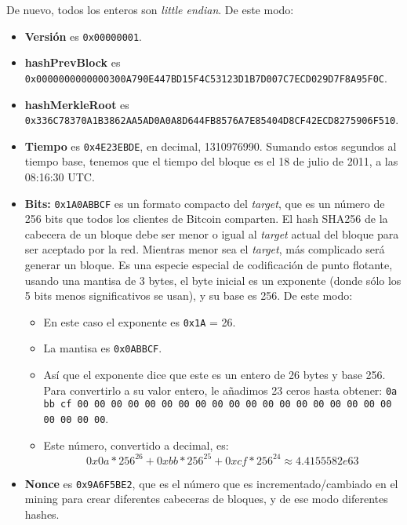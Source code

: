 \documentclass[10pt, a4paper]{article}
\theoremstyle{theorem-style}
\theoremstyle{theorem-style}
\theoremstyle{definition-style}
\theoremstyle{remark-style}
\theoremstyle{example-style}
\theoremstyle{definition-style}
\theoremstyle{remark-style}
\begin{document}
De nuevo, todos los enteros son \emph{little endian}. De este modo:

\begin{itemize}
\def\labelenumi{\arabic{enumi}.}
\itemsep1pt\parskip0pt
\item
  \textbf{Versión} es \texttt{0x00000001}.
\item
  \textbf{hashPrevBlock} es\\\texttt{0x0000000000000300A790E447BD15F4C53123D1B7D007C7ECD029D7F8A95F0C}.
\item
	\textbf{hashMerkleRoot} es\\\texttt{0x336C78370A1B3862AA5AD0A0A8D644FB8576A7E85404D8CF42ECD8275906F510}.
\item
	\textbf{Tiempo} es \texttt{0x4E23EBDE}, en decimal, 1310976990. Sumando estos segundos al tiempo base, tenemos que el tiempo del bloque es el 18 de julio de 2011, a las 08:16:30 UTC.
\item
	\textbf{Bits:} \texttt{0x1A0ABBCF} es un formato compacto del \emph{target}, que es un número de 256 bits que todos los clientes de Bitcoin comparten. El hash SHA256 de la cabecera de un bloque debe ser menor o igual al \emph{target} actual del bloque para ser aceptado por la red. Mientras menor sea el \emph{target}, más complicado será generar un bloque. Es una especie especial de codificación de punto flotante, usando una mantisa de 3 bytes, el byte inicial es un exponente (donde sólo los 5 bits menos significativos se usan), y su base es 256. De este modo:
	\begin{itemize}
	\def\labelenumi{\arabic{enumi}.}
	\itemsep1pt\parskip0pt
	\item
		En este caso el exponente es \texttt{0x1A} = 26.
	\item
		La mantisa es \texttt{0x0ABBCF}.
	\item
		Así que el exponente dice que este es un entero de 26 bytes y base 256. Para convertirlo a su valor entero, le añadimos 23 ceros hasta obtener: \texttt{0a bb cf 00 00   00 00 00 00 00    00 00 00 00 00    00 00 00 00 00    00 00 00 00    00 00}.
	\item
		Este número, convertido a decimal, es:$$0x0a * 256^{26} + 0xbb * 256^{25} + 0xcf*256^{24} \approx  4.4155582e63$$
	\end{itemize}
\item
	\textbf{Nonce} es \texttt{0x9A6F5BE2}, que es el número que es incrementado/cambiado en el mining para crear diferentes cabeceras de bloques, y de ese modo diferentes hashes.
\end{itemize}
\end{document}

